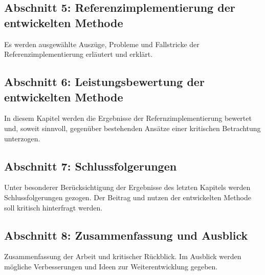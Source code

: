 		\subsection*{Abschnitt 5: Referenzimplementierung der entwickelten Methode}
			Es werden ausgewählte Auszüge, Probleme und Fallstricke der Referenzimplementierung erläutert und erklärt. 

		\subsection*{Abschnitt 6: Leistungsbewertung der entwickelten Methode}
			In diesem Kapitel werden die Ergebnisse der Refernzimplementierung bewertet und, soweit sinnvoll, gegenüber bestehenden Ansätze einer kritischen Betrachtung unterzogen. 


		\subsection*{Abschnitt 7: Schlussfolgerungen}
			Unter besonderer Berücksichtigung der Ergebnisse des letzten Kapitels werden Schlussfolgerungen gezogen. 
			Der Beitrag und nutzen der entwickelten Methode soll kritisch hinterfragt werden.

		\subsection*{Abschnitt 8: Zusammenfassung und Ausblick}
			Zusammenfassung der Arbeit und kritischer Rückblick. Im Ausblick werden mögliche Verbesserungen und Ideen zur Weiterentwicklung gegeben.  